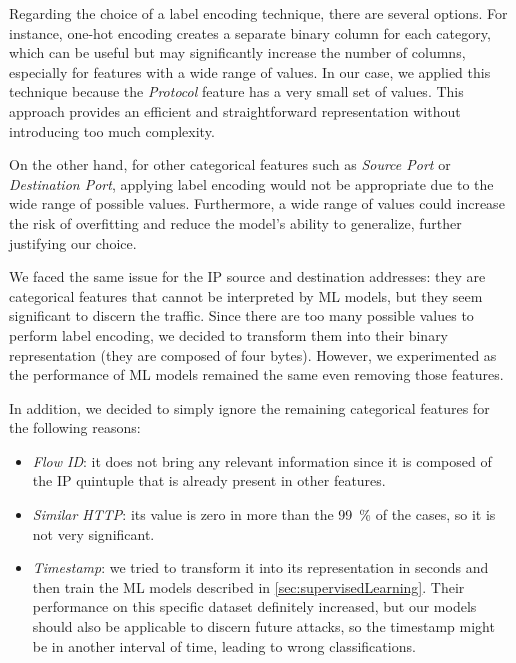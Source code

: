 \documentclass[acmlarge,nonacm]{acmart}
\begin{document}
Regarding the choice of a label encoding technique, there are several options. For instance, one-hot encoding creates a separate binary column for each category, which can be useful but may significantly increase the number of columns, especially for features with a wide range of values. In our case, we applied this technique because the \emph{Protocol} feature has a very small set of values. This approach provides an efficient and straightforward representation without introducing too much complexity.

On the other hand, for other categorical features such as \emph{Source Port} or \emph{Destination Port}, applying label encoding would not be appropriate due to the wide range of possible values. Furthermore, a wide range of values could increase the risk of overfitting and reduce the model's ability to generalize, further justifying our choice. 

We faced the same issue for the IP source and destination addresses: they are categorical features that cannot be interpreted by ML models, but they seem significant to discern the traffic. Since there are too many possible values to perform label encoding, we decided to transform them into their binary representation (they are composed of four bytes). However, we experimented as the performance of ML models remained the same even removing those features.

In addition, we decided to simply ignore the remaining categorical features for the following reasons:
\begin{itemize}
    \item \emph{Flow ID}: it does not bring any relevant information since it is composed of the IP quintuple that is already present in other features.
    \item \emph{Similar HTTP}: its value is zero in more than the \SI{99}{\percent} of the cases, so it is not very significant.
    \item \emph{Timestamp}: we tried to transform it into its representation in seconds and then train the ML models described in \cref{sec:supervisedLearning}. Their performance on this specific dataset definitely increased, but our models should also be applicable to discern future attacks, so the timestamp might be in another interval of time, leading to wrong classifications.
\end{itemize}
\end{document}
